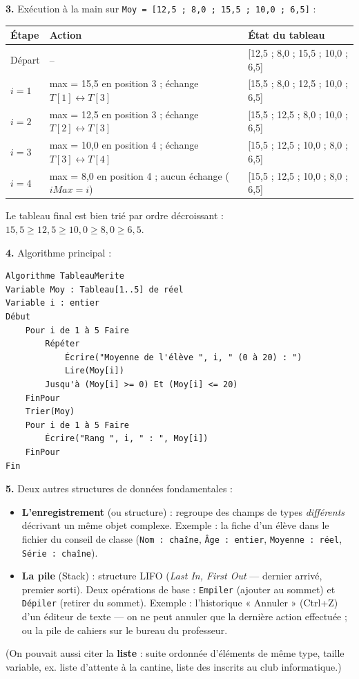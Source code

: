 \documentclass[11pt]{article}
\newcommand{\cle}[1]{{\popxbold\color{popdark}#1}}
\begin{document}
\begin{corrige}
\textbf{3.} Exécution à la main sur \texttt{Moy = [12,5 ; 8,0 ; 15,5 ; 10,0 ; 6,5]} :

\begin{center}
\begin{tabularx}{\linewidth}{|l|X|X|}
\hline
\rowcolor{popblueL} \textbf{Étape} & \textbf{Action} & \textbf{État du tableau} \\
\hline
Départ & -- & [12,5 ; 8,0 ; 15,5 ; 10,0 ; 6,5] \\
\hline
$i=1$ & max = 15,5 en position 3 ; échange $T[1] \leftrightarrow T[3]$ & [15,5 ; 8,0 ; 12,5 ; 10,0 ; 6,5] \\
\hline
$i=2$ & max = 12,5 en position 3 ; échange $T[2] \leftrightarrow T[3]$ & [15,5 ; 12,5 ; 8,0 ; 10,0 ; 6,5] \\
\hline
$i=3$ & max = 10,0 en position 4 ; échange $T[3] \leftrightarrow T[4]$ & [15,5 ; 12,5 ; 10,0 ; 8,0 ; 6,5] \\
\hline
$i=4$ & max = 8,0 en position 4 ; aucun échange ($iMax = i$) & [15,5 ; 12,5 ; 10,0 ; 8,0 ; 6,5] \\
\hline
\end{tabularx}
\end{center}

Le tableau final est bien trié par ordre décroissant : $15{,}5 \geq 12{,}5 \geq 10{,}0 \geq 8{,}0 \geq 6{,}5$.

\textbf{4.} Algorithme principal :

\begin{lstlisting}
Algorithme TableauMerite
Variable Moy : Tableau[1..5] de réel
Variable i : entier
Début
    Pour i de 1 à 5 Faire
        Répéter
            Écrire("Moyenne de l'élève ", i, " (0 à 20) : ")
            Lire(Moy[i])
        Jusqu'à (Moy[i] >= 0) Et (Moy[i] <= 20)
    FinPour
    Trier(Moy)
    Pour i de 1 à 5 Faire
        Écrire("Rang ", i, " : ", Moy[i])
    FinPour
Fin
\end{lstlisting}

\textbf{5.} Deux autres structures de données fondamentales :
\begin{itemize}
  \item \textbf{L'\cle{enregistrement}} (ou structure) : regroupe des champs de types \emph{différents} décrivant un même objet complexe. Exemple : la fiche d'un élève dans le fichier du conseil de classe (\texttt{Nom : chaîne}, \texttt{Âge : entier}, \texttt{Moyenne : réel}, \texttt{Série : chaîne}).
  \item \textbf{La \cle{pile}} (Stack) : structure LIFO (\emph{Last In, First Out} — dernier arrivé, premier sorti). Deux opérations de base : \texttt{Empiler} (ajouter au sommet) et \texttt{Dépiler} (retirer du sommet). Exemple : l'historique « Annuler » (Ctrl+Z) d'un éditeur de texte — on ne peut annuler que la dernière action effectuée ; ou la pile de cahiers sur le bureau du professeur.
\end{itemize}
(On pouvait aussi citer la \textbf{liste} : suite ordonnée d'éléments de même type, taille variable, ex. liste d'attente à la cantine, liste des inscrits au club informatique.)


\end{corrige}
\end{document}
